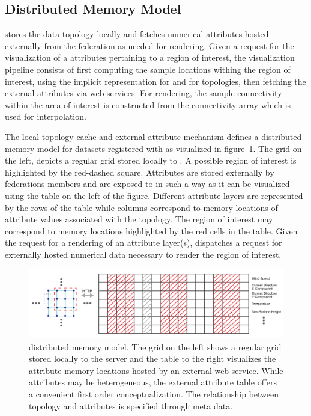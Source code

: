 \subsection{Distributed Memory Model}
\sciwms{} stores the data topology locally and fetches numerical
attributes hosted externally from the federation as needed for
rendering. Given a request for the visualization of a attributes
pertaining to a region of interest, the visualization pipeline
consists of first computing the sample locations withing the region of
interest, using the implicit representation for \cgrid{} and \rtree{}
for \ugrid{} topologies, then fetching the external attributes via
\ogc{} web-services. For rendering, the sample connectivity within the
area of interest is constructed from the connectivity array which is
used for interpolation.

The local topology cache and external attribute mechanism defines a
distributed memory model for datasets registered with \sciwms{} as
visualized in figure~\ref{fig:sciwms_mem_model}. The grid on the left,
depicts a regular grid stored locally to \sciwms{}. A possible region
of interest is highlighted by the red-dashed square. Attributes are
stored externally by federations members and are exposed to \sciwms{}
in such a way as it can be visualized using the table on the left of
the figure. Different attribute layers are represented by the rows of
the table while columns correspond to memory locations of attribute
values associated with the topology. The region of interest may correspond
to memory locations highlighted by the red cells in the table. Given
the request for a rendering of an attribute layer(s), \sciwms{}
dispatches a request for externally hosted numerical data necessary to
render the region of interest. 
\begin{figure}[ht!]
  \centering
  \includegraphics[width=\textwidth]{../figs/topology_memModel}
  \caption{\sciwms{} distributed memory model. The grid on the left
    shows a regular grid stored locally to the \sciwms{} server and
    the table to the right visualizes the attribute memory locations
    hosted by an external web-service. While attributes may be
    heterogeneous, the external attribute table offers a convenient
    first order conceptualization. The relationship between topology
    and attributes is specified through \ncml{} meta data.}
  \label{fig:sciwms_mem_model}
\end{figure}

